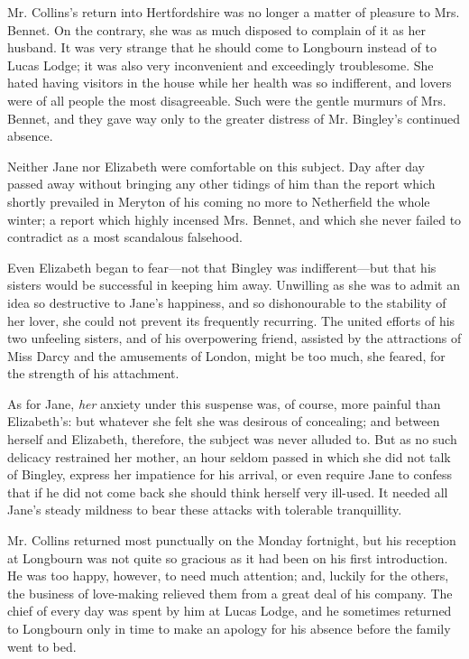 \documentclass[12pt,openright]{book}
\begin{document}
Mr. Collins’s return into Hertfordshire was no longer a matter of pleasure to Mrs. Bennet. On the contrary, she was as much disposed to complain of it as her husband. It was very strange that he should come to Longbourn instead of to Lucas Lodge; it was also very inconvenient and exceedingly troublesome. She hated having visitors in the house while her health was so indifferent, and lovers were of all people the most disagreeable. Such were the gentle murmurs of Mrs. Bennet, and they gave way only to the greater distress of Mr. Bingley’s continued absence.

Neither Jane nor Elizabeth were comfortable on this subject. Day after day passed away without bringing any other tidings of him than the report which shortly prevailed in Meryton of his coming no more to Netherfield the whole winter; a report which highly incensed Mrs. Bennet, and which she never failed to contradict as a most scandalous falsehood.

Even Elizabeth began to fear—not that Bingley was indifferent—but that his sisters would be successful in keeping him away. Unwilling as she was to admit an idea so destructive to Jane’s happiness, and so dishonourable to the stability of her lover, she could not prevent its frequently recurring. The united efforts of his two unfeeling sisters, and of his overpowering friend, assisted by the attractions of Miss Darcy and the amusements of London, might be too much, she feared, for the strength of his attachment.

As for Jane, \textit{her} anxiety under this suspense was, of course, more painful than Elizabeth’s: but whatever she felt she was desirous of concealing; and between herself and Elizabeth, therefore, the subject was never alluded to. But as no such delicacy restrained her mother, an hour seldom passed in which she did not talk of Bingley, express her impatience for his arrival, or even require Jane to confess that if he did not come back she should think herself very ill-used. It needed all Jane’s steady mildness to bear these attacks with tolerable tranquillity.

Mr. Collins returned most punctually on the Monday fortnight, but his reception at Longbourn was not quite so gracious as it had been on his first introduction. He was too happy, however, to need much attention; and, luckily for the others, the business of love-making relieved them from a great deal of his company. The chief of every day was spent by him at Lucas Lodge, and he sometimes returned to Longbourn only in time to make an apology for his absence before the family went to bed.
\end{document}
